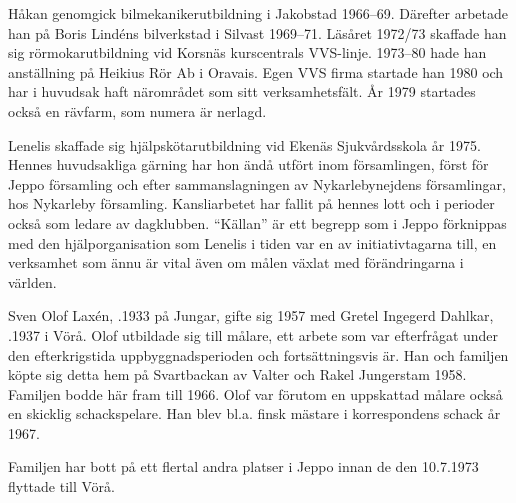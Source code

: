 Håkan genomgick bilmekanikerutbildning i Jakobstad 1966--69. Därefter arbetade han på Boris Lindéns bilverkstad i Silvast 1969--71. Läsåret 1972/73 skaffade han sig rörmokarutbildning vid Korsnäs kurscentrals VVS-linje. 1973--80 hade han anställning på Heikius Rör Ab i Oravais. Egen VVS firma startade han 1980 och har i huvudsak haft närområdet som sitt verksamhetsfält. År 1979 startades också en rävfarm, som numera är nerlagd.

Lenelis skaffade sig hjälpskötarutbildning vid Ekenäs Sjukvårdsskola år 1975. Hennes huvudsakliga gärning har hon ändå utfört inom församlingen, först för Jeppo församling och efter sammanslagningen av Nykarlebynejdens församlingar, hos Nykarleby församling.  Kansliarbetet har fallit på hennes lott och i perioder också som ledare av dagklubben. ``Källan'' är ett begrepp som i Jeppo förknippas med den hjälporganisation som Lenelis i tiden var en av initiativtagarna till, en verksamhet som ännu är vital även om målen växlat med förändringarna i världen.
\begin{jhchildren}
  \item {}
  \item {}
  \item {}
\end{jhchildren}


Sven Olof Laxén, .1933 på Jungar, gifte sig 1957 med Gretel Ingegerd Dahlkar, .1937 i Vörå. Olof utbildade sig till målare, ett arbete som var efterfrågat under den efterkrigstida uppbyggnadsperioden och fortsättningsvis är. Han och familjen köpte sig detta hem på Svartbackan av Valter och Rakel Jungerstam 1958. Familjen bodde här fram till 1966. Olof var förutom en uppskattad målare också en skicklig schackspelare. Han blev bl.a. finsk mästare i korrespondens schack år 1967.
\begin{jhchildren}
  \item {}
  \item {}
\end{jhchildren}

Familjen har bott på ett flertal andra platser i Jeppo innan de den 10.7.1973 flyttade till Vörå.


